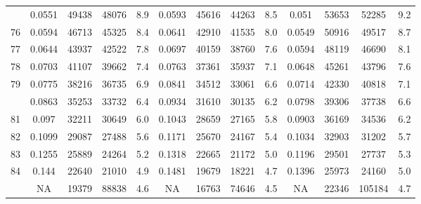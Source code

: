 \documentclass[
  14pt,
]{article}
\begin{document}
\begin{longtable}[t]{lcccccccccccc}
\addlinespace
75 & 0.0551 & 49438 & 48076 & 8.9 & 0.0593 & 45616 & 44263 & 8.5 & 0.051 & 53653 & 52285 & 9.2\\
76 & 0.0594 & 46713 & 45325 & 8.4 & 0.0641 & 42910 & 41535 & 8.0 & 0.0549 & 50916 & 49517 & 8.7\\
77 & 0.0644 & 43937 & 42522 & 7.8 & 0.0697 & 40159 & 38760 & 7.6 & 0.0594 & 48119 & 46690 & 8.1\\
78 & 0.0703 & 41107 & 39662 & 7.4 & 0.0763 & 37361 & 35937 & 7.1 & 0.0648 & 45261 & 43796 & 7.6\\
79 & 0.0775 & 38216 & 36735 & 6.9 & 0.0841 & 34512 & 33061 & 6.6 & 0.0714 & 42330 & 40818 & 7.1\\
\addlinespace
80 & 0.0863 & 35253 & 33732 & 6.4 & 0.0934 & 31610 & 30135 & 6.2 & 0.0798 & 39306 & 37738 & 6.6\\
81 & 0.097 & 32211 & 30649 & 6.0 & 0.1043 & 28659 & 27165 & 5.8 & 0.0903 & 36169 & 34536 & 6.2\\
82 & 0.1099 & 29087 & 27488 & 5.6 & 0.1171 & 25670 & 24167 & 5.4 & 0.1034 & 32903 & 31202 & 5.7\\
83 & 0.1255 & 25889 & 24264 & 5.2 & 0.1318 & 22665 & 21172 & 5.0 & 0.1196 & 29501 & 27737 & 5.3\\
84 & 0.144 & 22640 & 21010 & 4.9 & 0.1481 & 19679 & 18221 & 4.7 & 0.1396 & 25973 & 24160 & 5.0\\
\addlinespace
85 & NA & 19379 & 88838 & 4.6 & NA & 16763 & 74646 & 4.5 & NA & 22346 & 105184 & 4.7\\*
\end{longtable}
\end{document}
